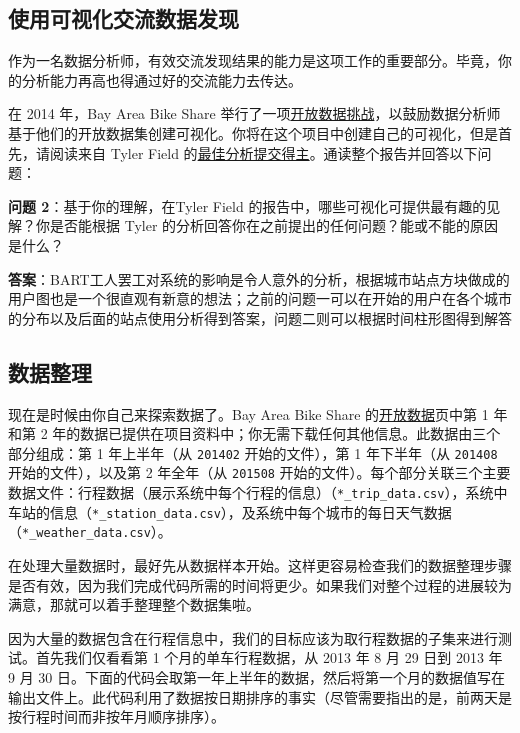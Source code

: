 \documentclass[11pt]{article}
\begin{document}
    \subsection{使用可视化交流数据发现}\label{ux4f7fux7528ux53efux89c6ux5316ux4ea4ux6d41ux6570ux636eux53d1ux73b0}

作为一名数据分析师，有效交流发现结果的能力是这项工作的重要部分。毕竟，你的分析能力再高也得通过好的交流能力去传达。

在 2014 年，Bay Area Bike Share
举行了一项\href{http://www.bayareabikeshare.com/datachallenge-2014}{开放数据挑战}，以鼓励数据分析师基于他们的开放数据集创建可视化。你将在这个项目中创建自己的可视化，但是首先，请阅读来自
Tyler Field
的\href{http://thfield.github.io/babs/index.html}{最佳分析提交得主}。通读整个报告并回答以下问题：

\textbf{问题 2}：基于你的理解，在Tyler Field
的报告中，哪些可视化可提供最有趣的见解？你是否能根据 Tyler
的分析回答你在之前提出的任何问题？能或不能的原因是什么？

\textbf{答案}：BART工人罢工对系统的影响是令人意外的分析，根据城市站点方块做成的用户图也是一个很直观有新意的想法；之前的问题一可以在开始的用户在各个城市的分布以及后面的站点使用分析得到答案，问题二则可以根据时间柱形图得到解答

    \subsection{数据整理}\label{ux6570ux636eux6574ux7406}

现在是时候由你自己来探索数据了。Bay Area Bike Share
的\href{http://www.bayareabikeshare.com/open-data}{开放数据}页中第 1
年和第 2
年的数据已提供在项目资料中；你无需下载任何其他信息。此数据由三个部分组成：第
1 年上半年（从 \texttt{201402} 开始的文件），第 1 年下半年（从
\texttt{201408} 开始的文件），以及第 2 年全年（从 \texttt{201508}
开始的文件）。每个部分关联三个主要数据文件：行程数据（展示系统中每个行程的信息）（\texttt{*\_trip\_data.csv}），系统中车站的信息（\texttt{*\_station\_data.csv}），及系统中每个城市的每日天气数据（\texttt{*\_weather\_data.csv}）。

在处理大量数据时，最好先从数据样本开始。这样更容易检查我们的数据整理步骤是否有效，因为我们完成代码所需的时间将更少。如果我们对整个过程的进展较为满意，那就可以着手整理整个数据集啦。

因为大量的数据包含在行程信息中，我们的目标应该为取行程数据的子集来进行测试。首先我们仅看看第
1 个月的单车行程数据，从 2013 年 8 月 29 日到 2013 年 9 月 30
日。下面的代码会取第一年上半年的数据，然后将第一个月的数据值写在输出文件上。此代码利用了数据按日期排序的事实（尽管需要指出的是，前两天是按行程时间而非按年月顺序排序）。
\end{document}
